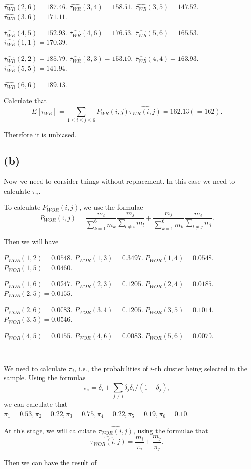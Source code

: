 \documentclass[12pt]{article}%
\begin{document}
$\widehat{\tau_{WR}}(2,6)=187.46.$
$\widehat{\tau_{WR}}(3,4)=158.51.$
$\widehat{\tau_{WR}}(3,5)=147.52.$
$\widehat{\tau_{WR}}(3,6)=171.11.$

$\widehat{\tau_{WR}}(4,5)=152.93.$
$\widehat{\tau_{WR}}(4,6)=176.53.$
$\widehat{\tau_{WR}}(5,6)=165.53.$
$\widehat{\tau_{WR}}(1,1)=170.39.$

$\widehat{\tau_{WR}}(2,2)=185.79.$
$\widehat{\tau_{WR}}(3,3)=153.10.$
$\widehat{\tau_{WR}}(4,4)=163.93.$
$\widehat{\tau_{WR}}(5,5)=141.94.$

$\widehat{\tau_{WR}}(6,6)=189.13.$


Calculate that 
$$E[\widehat{\tau_{WR}}]
=\sum_{1\leq i\leq j\leq 6}P_{WR}(i,j)\widehat{\tau_{WR}(i,j)}
=162.13(=162).$$

Therefore it is unbiased.

\subsection{(b)}
Now we need to consider things without replacement. In this case 
we need to calculate $\pi_i.$ 

To calculate $P_{WOR}(i,j)$, we use the formulae 
$$P_{WOR}(i,j)=
\frac{m_i}{\sum_{k=1}^6 m_k} \frac{m_j}{\sum_{l \neq i} m_l}
+\frac{m_j}{\sum_{k=1}^6 m_k} \frac{m_i}{\sum_{l \neq j} m_l}.$$

Then we will have 

$P_{WOR}(1,2)=0.0548.$ $P_{WOR}(1,3)=0.3497.$ 
$P_{WOR}(1,4)=0.0548.$ $P_{WOR}(1,5)=0.0460.$

$P_{WOR}(1,6)=0.0247.$ $P_{WOR}(2,3)=0.1205.$
$P_{WOR}(2,4)=0.0185.$ $P_{WOR}(2,5)=0.0155.$

$P_{WOR}(2,6)=0.0083.$ $P_{WOR}(3,4)=0.1205.$
$P_{WOR}(3,5)=0.1014.$ $P_{WOR}(3,5)=0.0546.$

$P_{WOR}(4,5)=0.0155.$ $P_{WOR}(4,6)=0.0083.$
$P_{WOR}(5,6)=0.0070.$

~\ 

We need to calculate $\pi_i$, i.e., the probabilities of $i$-th 
cluster being selected in the sample. 
Using the formulae $$\pi_i = 
\delta_i + \sum_{j \neq i}\delta_j \delta_i/(1-\delta_j),$$ 
we can calculate that $\pi_1 = 0.53,
\pi_2 = 0.22, \pi_3 = 0.75, \pi_4 = 0.22, \pi_5 = 0.19, \pi_6 = 0.10.$



At this stage, we will calculate $\widehat{\tau_{WOR}(i,j)}$, 
using the formulae that 
$$\widehat{\tau_{WOR}(i,j)}=\frac{m_i}{\pi_i} + \frac{m_j}{\pi_j}.$$

Then we can have the result of 
\end{document}
